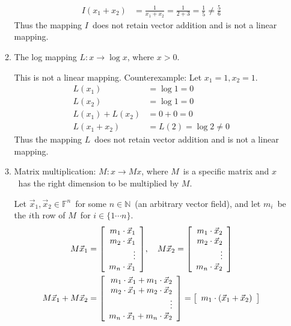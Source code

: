 \documentclass{letter}
\newcommand{\Vn}[1]{\vec{#1}}
\newcommand{\?}{\stackrel{?}{=}}
\newcommand\Ans[2][]{%
   \leavevmode\noindent
   {
       \begin{mdframed}[backgroundcolor=blue!10]
       #2
       \end{mdframed}
   }
}
\newenvironment{Mat}[1]{%
  \left[\begin{array}{*{#1}{r}}
}{%
  \end{array}\right]
}
\begin{document}
\begin{enumerate}
\begin{enumerate}
{\begin{align*}
            I(x_1+x_2)&=\frac{1}{x_1+x_2}=\frac{1}{2+3}=\frac{1}{5} \not = \frac{5}{6}
         \end{align*}
         Thus the mapping $I$\ does not retain vector addition and is not a linear mapping.
    }    
    \item The log mapping $L:x\to\log x$, where $x>0$.
    \Ans{
        This is not a linear mapping.  Counterexample: Let $x_1=1, x_2=1$.
        \begin{align*}
            L(x_1) &= \log 1 = 0 \\
            L(x_2) &= \log 1 = 0 \\
            L(x_1) + L(x_2) &= 0 + 0 = 0 \\
            L(x_1+x_2) &= L(2) = \log 2 \not = 0 
        \end{align*}
        Thus the mapping $L$\ does not retain vector addition and is not a linear mapping.
    }
    \newpage
    \item Matrix multiplication: $M:x\to Mx$, where $M$\ is a specific matrix and $x$\ has the right dimension to be multiplied by $M$.
    \Ans{
      Let $\Vn{x}_1,\Vn{x}_2\in \mathbb{F}^n$\ for some $n\in\mathbb{N}$\ (an arbitrary vector field),
      and let $m_i$\ be the $i$th row of $M$\ for $i\in\{1\cdots n\}$.
      \begin{align*}
          M\Vn{x}_1 &= \begin{Mat}{1} m_1\cdot \Vn{x}_1\\ m_2\cdot\Vn{x}_1 \\ \vdots \\ m_n\cdot\Vn{x}_1 \end{Mat}, ~~~
          M\Vn{x}_2 = \begin{Mat}{1} m_1\cdot \Vn{x}_2\\ m_2\cdot\Vn{x}_2 \\ \vdots \\ m_n\cdot\Vn{x}_2 \end{Mat} \\
          M\Vn{x}_1 + M\Vn{x}_2 &= \begin{Mat}{1} m_1\cdot \Vn{x}_1 +  m_1\cdot \Vn{x}_2 \\ 
                                                  m_2\cdot\Vn{x}_1 + m_2\cdot\Vn{x}_2 \\
                                                  \vdots \\ 
                                                  m_n\cdot\Vn{x}_1 + m_n\cdot\Vn{x}_2\end{Mat}
                                = \begin{Mat}{1} m_1\cdot(\Vn{x}_1 + \Vn{x}_2) \\

\end{Mat}
\end{align*}}
\end{enumerate}
\end{enumerate}
\end{document}
